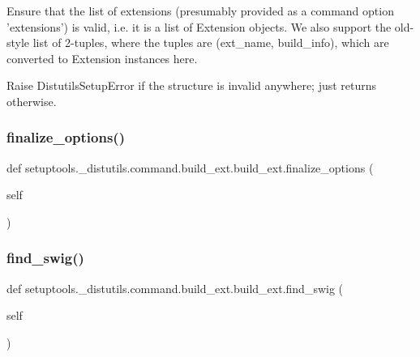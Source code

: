 \begin{DoxyVerb}Ensure that the list of extensions (presumably provided as a
command option 'extensions') is valid, i.e. it is a list of
Extension objects.  We also support the old-style list of 2-tuples,
where the tuples are (ext_name, build_info), which are converted to
Extension instances here.

Raise DistutilsSetupError if the structure is invalid anywhere;
just returns otherwise.
\end{DoxyVerb}
 \mbox{\label{classsetuptools_1_1__distutils_1_1command_1_1build__ext_1_1build__ext_ac37e44017ecb8c528a10df9bbffcf130}} 
\subsubsection{\texorpdfstring{finalize\+\_\+options()}{finalize\_options()}}
{\footnotesize\ttfamily def setuptools.\+\_\+distutils.\+command.\+build\+\_\+ext.\+build\+\_\+ext.\+finalize\+\_\+options (\begin{DoxyParamCaption}\item[{}]{self }\end{DoxyParamCaption})}

\mbox{\label{classsetuptools_1_1__distutils_1_1command_1_1build__ext_1_1build__ext_a3f5a739c5017d50574c3a2f3e9d3c0c1}} 
\subsubsection{\texorpdfstring{find\+\_\+swig()}{find\_swig()}}
{\footnotesize\ttfamily def setuptools.\+\_\+distutils.\+command.\+build\+\_\+ext.\+build\+\_\+ext.\+find\+\_\+swig (\begin{DoxyParamCaption}\item[{}]{self }\end{DoxyParamCaption})}

